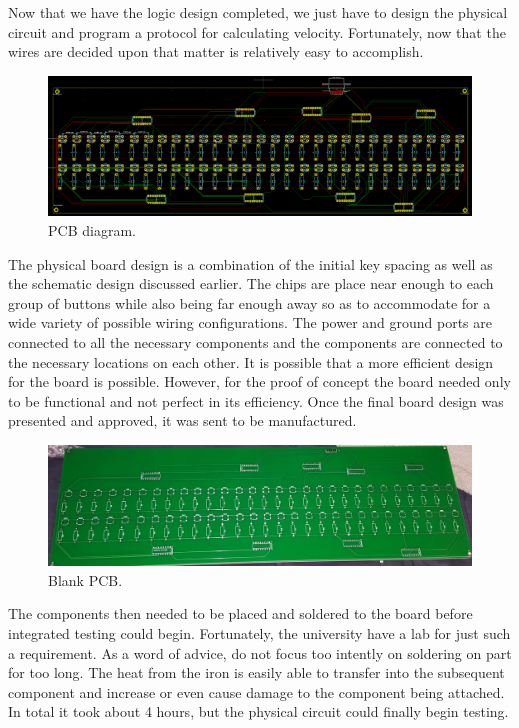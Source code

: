 Now that we have the logic design completed, we just have to design the physical circuit
and program a protocol for calculating velocity. Fortunately, now that the wires are
decided upon that matter is relatively easy to accomplish.


\begin{figure}[h!]
  \centering
  \includegraphics[width=\linewidth]{image/pcbdiagram.png}
  \caption{PCB diagram.}
\end{figure}


The physical board design is a combination of the initial key spacing as well as the
schematic design discussed earlier. The chips are place near enough to each group of
buttons while also being far enough away so as to accommodate for a wide variety of
possible wiring configurations. The power and ground ports are connected to all the
necessary components and the components are connected to the necessary locations on each
other. It is possible that a more efficient design for the board is possible. However, for
the proof of concept the board needed only to be functional and not perfect in its
efficiency. Once the final board design was presented and approved, it was sent to be
manufactured.

\begin{figure}[h!]
  \centering
  \includegraphics[width=\linewidth]{image/printedpcb.jpg}
  \caption{Blank PCB.}
\end{figure}

The components then needed to be placed and soldered to the board before integrated
testing could begin. Fortunately, the university have a lab for just such a requirement.
As a word of advice, do not focus too intently on soldering on part for too long. The heat
from the iron is easily able to transfer into the subsequent component and increase or
even cause damage to the component being attached. In total it took about 4 hours, but the
physical circuit could finally begin testing.

